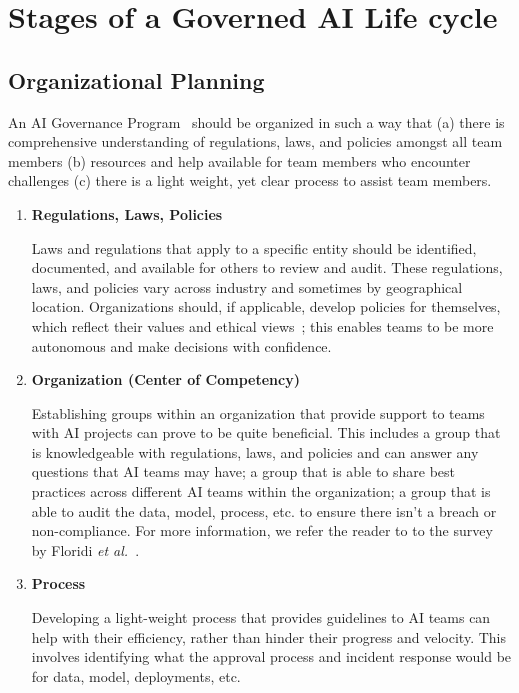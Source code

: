 \documentclass{article}
\begin{document}
\section{Stages of a Governed AI Life cycle}

\subsection{Organizational Planning}

An AI Governance Program~\cite{kuziemski2020ai, dafoe2018ai, wang2018artificial} should be organized in such a way that (a) there is comprehensive understanding of regulations, laws, and policies amongst all team members (b) resources and help available for team members who encounter challenges (c) there is a light weight, yet clear process to assist team members.

\begin{enumerate}
    \item \textbf{Regulations, Laws, Policies}
    
    \smallskip Laws and regulations that apply to a specific entity should be identified, documented, and available for others to review and audit. These regulations, laws, and policies vary across industry and sometimes by geographical location. Organizations should, if applicable, develop policies for themselves, which reflect their values and ethical views~\cite{wang2018artificial, mittelstadt2019principles, floridi2018ai4people}; this enables teams to be more autonomous and make decisions with confidence.
    
    \item \textbf{Organization (Center of Competency)}
    
    \smallskip Establishing groups within an organization that provide support to teams with AI projects can prove to be quite beneficial. This includes a group that is knowledgeable with regulations, laws, and policies and can answer any questions that AI teams may have; a group that is able to share best practices across different AI teams within the organization; a group that is able to audit the data, model, process, etc. to ensure there isn't a breach or non-compliance. For more information, we refer the reader to to the survey by Floridi \emph{et al.}~\cite{floridi2018ai4people}.

    \item \textbf{Process}
    
    \smallskip Developing a light-weight process that provides guidelines to AI teams can help with their efficiency, rather than hinder their progress and velocity. This involves identifying what the approval process and incident response would be for data, model, deployments, etc.%
\end{enumerate}
\end{document}
